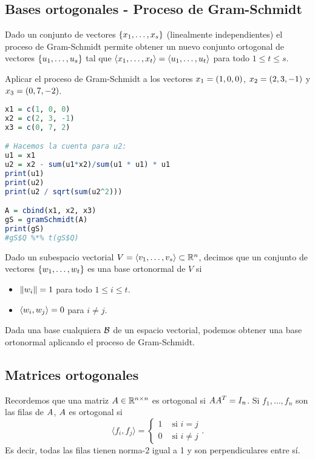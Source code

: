 \begin{tcolorbox}
\subsection{Bases ortogonales - Proceso de Gram-Schmidt}

Dado un conjunto de vectores $\{\xb_1, \dots, \xb_s\}$ (linealmente independientes) el proceso de Gram-Schmidt permite obtener un nuevo conjunto ortogonal de vectores $\{\ub_1, \dots, \ub_s\}$ tal que $\langle \xb_1, \dots, \xb_t\rangle = \langle \ub_1, \dots, \ub_t\rangle$ para todo $1 \le t \le s$.


\begin{ej}
Aplicar el proceso de Gram-Schmidt a los vectores $\xb_1 = (1, 0, 0)$, $\xb_2 = (2, 3, -1)$ y $\xb_3=(0, 7, -2)$.

\begin{lstlisting}[language=R]
x1 = c(1, 0, 0)
x2 = c(2, 3, -1)
x3 = c(0, 7, 2)

# Hacemos la cuenta para u2:
u1 = x1
u2 = x2 - sum(u1*x2)/sum(u1 * u1) * u1
print(u1)
print(u2)
print(u2 / sqrt(sum(u2^2)))

A = cbind(x1, x2, x3)
gS = gramSchmidt(A)
print(gS)
#gS$Q %*% t(gS$Q)
\end{lstlisting}
\end{ej}


Dado un subespacio vectorial $V = \langle \vb_1, \dots, \vb_s \rangle \subset \R^n$, decimos que un conjunto de vectores $\{\wb_1, \dots, \wb_t\}$ es una base ortonormal de $V$ si

\begin{itemize}
\item $\|\wb_i\| = 1$ para todo $1 \le i \le t$.
\item $\langle \wb_i, \wb_j \rangle = 0$ para $i \neq j$.
\end{itemize}

Dada una base cualquiera $\mathcal B$ de un espacio vectorial, podemos obtener una base ortonormal aplicando el proceso de Gram-Schmidt.

\subsection{Matrices ortogonales}

Recordemos que una matriz $\Ab \in \mathbb{R}^{n \times n}$ es ortogonal si $\Ab \Ab^T = I_n$. Si $f_1, \dots, f_n$ son las filas de $\Ab$, $\Ab$ es ortogonal si
$$
\langle f_i , f_j\rangle =
\begin{cases}
1 & \text{ si } i = j \\
0 & \text{ si } i \ne j
\end{cases}.
$$
Es decir, todas las filas tienen norma-2 igual a 1 y son perpendiculares entre sí.






\end{tcolorbox}
